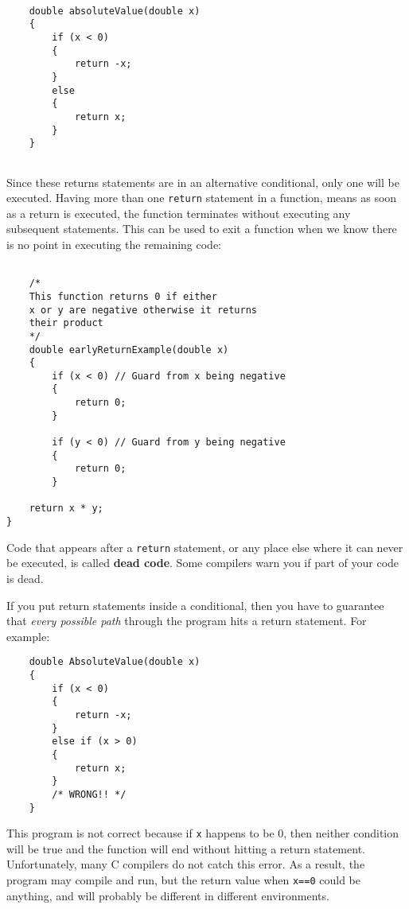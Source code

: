 \begin{verbatim}

    double absoluteValue(double x) 
    {
        if (x < 0) 
        {
            return -x;
        } 
        else 
        {
            return x;
        }
    }
  
\end{verbatim}
%
Since these returns statements are in an alternative conditional, only
one will be executed.  Having more than one
{\tt return} statement in a function, means as soon
as a return is executed, the function terminates without executing any
subsequent statements. This can be used to exit a function when 
we know there is no point in executing the remaining code:

\begin{verbatim}

	/*
	This function returns 0 if either 
	x or y are negative otherwise it returns
	their product
	*/
    double earlyReturnExample(double x) 
    {
        if (x < 0) // Guard from x being negative
        {
            return 0;
        } 

        if (y < 0) // Guard from y being negative
        {
            return 0;
        } 

	return x * y;
}

\end{verbatim}
%

Code that appears after a {\tt return} statement, or any place else
where it can never be executed, is called {\bf dead code}.  Some
compilers warn you if part of your code is dead.


If you put return statements inside a conditional, then
you have to guarantee that {\em every possible path} through
the program hits a return statement.  For example:

\begin{verbatim}
    double AbsoluteValue(double x) 
    {
        if (x < 0) 
        {
            return -x;
        } 
        else if (x > 0) 
        {
            return x;
        }
        /* WRONG!! */
    }
\end{verbatim}
%
This program is not correct because if {\tt x} happens to be 0, then
neither condition will be true and the function will end without hitting
a return statement.  Unfortunately, many C compilers do not catch
this error.  As a result, the program may compile and run, but the
return value when {\tt x==0} could be anything, and will probably
be different in different environments.

